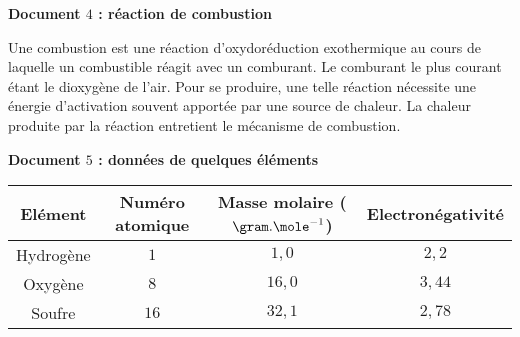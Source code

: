 \vspace{0.3cm}

\textbf{Document $4$ : réaction de combustion}

\vspace{0.3cm}

Une combustion est une réaction d'oxydoréduction exothermique au cours de laquelle un combustible réagit avec un comburant. Le comburant le plus courant étant le dioxygène de l'air. Pour se produire, une telle réaction nécessite une énergie d'activation souvent apportée par une
source de chaleur. La chaleur produite par la réaction entretient le mécanisme de combustion.

\vspace{0.3cm}

\textbf{Document $5$ : données de quelques éléments}


\begin{center}
\begin{tabular}{|c|c|c|c|}
\hline
Elément & Numéro atomique & Masse molaire ($\gram.\mole^{-1}$) & Electronégativité \\
\hline
Hydrogène & $1$ & $1,0$ & $2,2$ \\
\hline
Oxygène & $8$ & $16,0$ & $3,44$ \\
\hline
Soufre & $16$ & $32,1$ & $2,78$ \\
\hline
\end{tabular}
\end{center}

